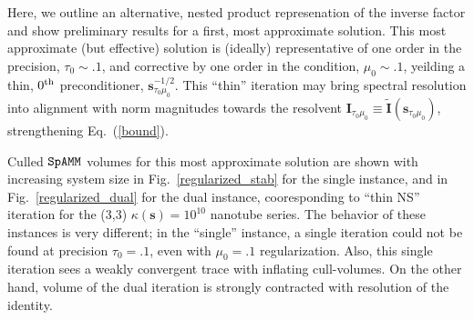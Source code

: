 \documentclass[letterpaper,twocolumn,amsmath,amsfont,amssymb,english,aps,jcp,preprintnumbers,groupaddress,nofootinbib,tightenlines,floatfix]{revtex4}
\newcommand{\mat}[1]{\boldsymbol{#1}}
\theoremstyle{plain}
\theoremstyle{remark}
\theoremstyle{plain}
\begin{document}
Here, we outline an alternative,  nested product represenation of the inverse factor and show preliminary 
results for a first, most approximate solution.  This most approximate (but effective) solution is (ideally) representative 
of one order in the precision, $\tau_0\sim .1$, and corrective by one order in the condition, $\mu_0\sim .1$,
yeilding a thin, $0^{\rm th}$ preconditioner, $\mat{s}^{-1/2}_{\tau_0 \mu_0}$.  
This ``thin'' iteration may bring spectral resolution into alignment with norm magnitudes 
towards the resolvent $\mat{I}_{\tau_0\mu_0}\equiv \widetilde{\mat{I}}\left(\mat{s}_{\tau_0\mu_0}\right)$,
strengthening Eq.~(\ref{bound}).

Culled $\tt SpAMM$ volumes for this most approximate solution are shown with increasing system size in 
Fig.~\ref{regularized_stab} for the single instance, and in Fig.~\ref{regularized_dual} for the dual instance, 
cooresponding to ``thin NS'' iteration for the (3,3) $\kappa(\mat{s})=10^{10}$ nanotube series.  
The behavior of these instances is very different; in the ``single'' 
instance, a single iteration could not be found at precision $\tau_0=.1$, even with $\mu_0=.1$ regularization.  Also, this single iteration
sees a weakly convergent trace with inflating cull-volumes. On the other hand, volume of the dual iteration 
is strongly contracted with resolution of the identity.  
 
\end{document}
